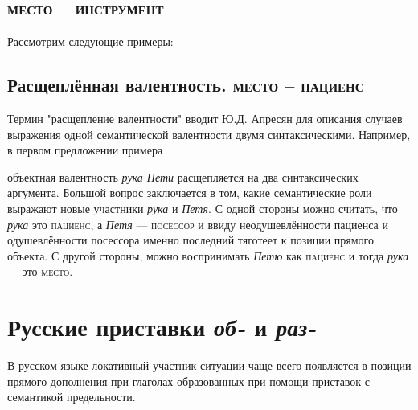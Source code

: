 \subsection{\textsc{место -- инструмент}}
Рассмотрим следующие примеры:


\subsection{Расщеплённая валентность. \textsc{место -- пациенс}}
Термин "расщепление валентности" вводит Ю.Д. Апресян \citep[153]{апресян1995избранные} для описания случаев выражения одной семантической валентности двумя синтаксическими. Например, в первом предложении примера  



объектная валентность \textit{рука Пети} расщепляется на два синтаксических аргумента. Большой вопрос заключается в том, какие семантические роли выражают новые участники \textit{рука} и \textit{Петя}. С одной стороны можно считать, что \textit{рука} это \textsc{пациенс}, а \textit{Петя} --- \textsc{посессор} и ввиду неодушевлённости пациенса и одушевлённости посессора именно последний тяготеет к позиции прямого объекта. С другой стороны, можно воспринимать \textit{Петю} как \textsc{пациенс} и тогда \textit{рука} --- это \textsc{место}.

\section{Русские приставки \textit{об-} и \textit{раз-}}

В русском языке локативный участник ситуации чаще всего появляется в позиции прямого дополнения при глаголах образованных при помощи приставок с семантикой предельности.

